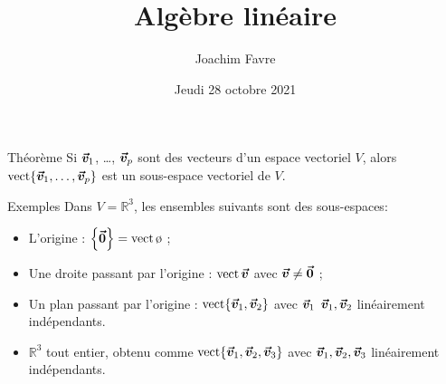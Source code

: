 \documentclass[a4paper]{article}
\title{Algèbre linéaire}
\author{Joachim Favre}
\date{Jeudi 28 octobre 2021}
\begin{document}
\maketitle


\begin{parag}{Théorème}
    Si $\bm{\protect\vec{v}}_1$, \ldots, $\bm{\protect\vec{v}}_p$ sont des vecteurs d'un espace vectoriel $V$, alors $\vect\left\{\bvec{v}_1, \ldots, \bvec{v}_p\right\}$ est un sous-espace vectoriel de $V$.
\end{parag}

\begin{parag}{Exemples}
    Dans $V = \mathbb{R}^3$, les ensembles suivants sont des sous-espaces:
    \begin{itemize}
        \item L'origine : $\left\{\bvec{0}\right\} = \vect\o$ ;
        \item Une droite passant par l'origine : $\operatorname{vect}{\bm{\protect\vec{v}}}$ avec $\bm{\protect\vec{v}} \neq \bm{\protect\vec{0}}$ ;
        \item Un plan passant par l'origine : $\vect\left\{\bvec{v}_1, \bvec{v}_2\right\}$ avec $\bm{\protect\vec{v}}_1$ $\bm{\protect\vec{v}}_1, \bm{\protect\vec{v}}_2$ linéairement indépendants.
        \item $\mathbb{R}^3$ tout entier, obtenu comme $\vect\left\{\bvec{v}_1, \bvec{v}_2, \bvec{v}_3\right\}$ avec $\bm{\protect\vec{v}}_1, \bm{\protect\vec{v}}_2, \bm{\protect\vec{v}}_3$ linéairement indépendants.
    \end{itemize}

\end{parag}
\end{document}
